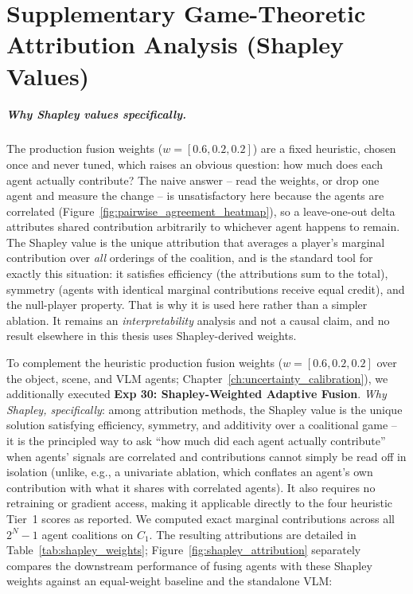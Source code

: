 \documentclass[12pt,a4paper]{report}
\begin{document}
\chapter{Supplementary Game-Theoretic Attribution Analysis (Shapley Values)}
\label{app:shapley}
\paragraph{Why Shapley values specifically.} The production fusion weights ($w=[0.6,0.2,0.2]$) are a fixed heuristic, chosen once and never tuned, which raises an obvious question: how much does each agent actually contribute? The naive answer -- read the weights, or drop one agent and measure the change -- is unsatisfactory here because the agents are correlated (Figure~\ref{fig:pairwise_agreement_heatmap}), so a leave-one-out delta attributes shared contribution arbitrarily to whichever agent happens to remain. The Shapley value \cite{shapley1953} is the unique attribution that averages a player's marginal contribution over \emph{all} orderings of the coalition, and is the standard tool for exactly this situation: it satisfies efficiency (the attributions sum to the total), symmetry (agents with identical marginal contributions receive equal credit), and the null-player property. That is why it is used here rather than a simpler ablation. It remains an \emph{interpretability} analysis and not a causal claim, and no result elsewhere in this thesis uses Shapley-derived weights.

To complement the heuristic production fusion weights ($w=[0.6,0.2,0.2]$ over the object, scene, and VLM agents; Chapter~\ref{ch:uncertainty_calibration}), we additionally executed \textbf{Exp 30: Shapley-Weighted Adaptive Fusion}. \emph{Why Shapley, specifically}: among attribution methods, the Shapley value \cite{shapley1953} is the unique solution satisfying efficiency, symmetry, and additivity over a coalitional game -- it is the principled way to ask ``how much did each agent actually contribute'' when agents' signals are correlated and contributions cannot simply be read off in isolation (unlike, e.g., a univariate ablation, which conflates an agent's own contribution with what it shares with correlated agents). It also requires no retraining or gradient access, making it applicable directly to the four heuristic Tier~1 scores as reported. We computed exact marginal contributions across all $2^N-1$ agent coalitions on $C_1$. The resulting attributions are detailed in Table~\ref{tab:shapley_weights}; Figure~\ref{fig:shapley_attribution} separately compares the downstream performance of fusing agents with these Shapley weights against an equal-weight baseline and the standalone VLM:
\end{document}
